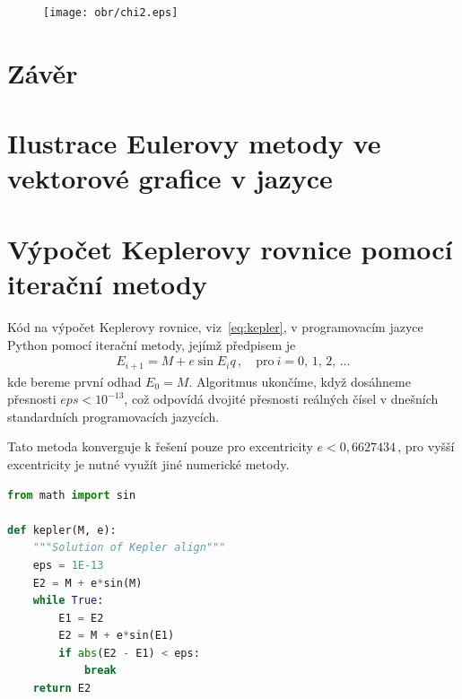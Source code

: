 \documentclass[A4paper, 12pt, oneside]{book}
\begin{document}
\begin{figure}
	\centering
	\texttt{[image: obr/chi2.eps]}
	\caption{} \label{fig:chi2}
\end{figure}


\chapter{Závěr} \label{ch:zaver}

\newpage

\printbibliography
\begin{appendices}
	\chapter{Ilustrace Eulerovy metody ve vektorové grafice v jazyce } \label{app:asy}

	\begin{figure}[!htb]
	\centering
	\end{figure}

	

	\chapter{Výpočet Keplerovy rovnice pomocí iterační metody} \label{app:kepit}
	Kód na výpočet Keplerovy rovnice, viz~\eqref{eq:kepler}, v programovacím jazyce Python pomocí iterační metody, jejímž předpisem je
	\begin{align*}
		E_{i+1}=M+e\sin{E_i}q\,, \quad \text{pro}\ i=0,\,1,\,2,\,\ldots
	\end{align*}
	kde bereme první odhad $E_0=M$. Algoritmus ukončíme, když dosáhneme přesnosti ${eps<10^{-13}}$, což odpovídá dvojité přesnosti reálných čísel v dnešních standardních programovacích jazycích.

	Tato metoda konverguje k řešení pouze pro excentricity $e<0,6627434\,$, pro vyšší excentricity je nutné využít jiné numerické metody.
\begin{lstlisting}[language=Python]
from math import sin

def kepler(M, e):
    """Solution of Kepler align"""
    eps = 1E-13
    E2 = M + e*sin(M)
    while True:
        E1 = E2
        E2 = M + e*sin(E1)
        if abs(E2 - E1) < eps:
            break 
    return E2
\end{lstlisting}

\end{appendices}
\end{document}
